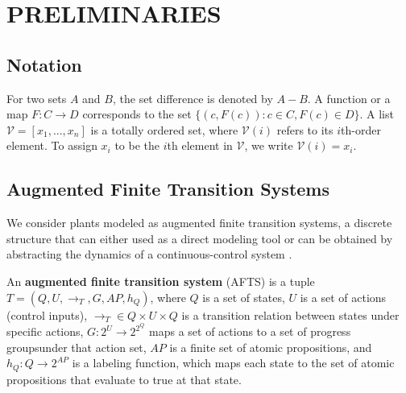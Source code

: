 \section{PRELIMINARIES}
\label{sec:pre}
\subsection{Notation}

For two sets $ A $ and $ B $, the set difference is denoted by $ A-B $. A function or a map $ F: C\rightarrow D $ {\color{purple} corresponds to  the set} $ \{(c,F(c)):c\in C, F(c)\in D \} $. A list $ \mathcal{V}=[x_1,...,x_n] $ is a totally ordered set, where $ \mathcal{V}(i) $ refers to its $ i $th-order element. To assign $ x_i $ to be the $ i $th element in	 $ \mathcal{V} $, we write $ \mathcal{V}(i) = x_i $. %

\subsection{Augmented Finite Transition Systems}

We consider plants modeled as augmented finite transition systems, a discrete structure that can either used as a direct modeling tool or can be obtained by abstracting the dynamics of a continuous-control system \cite{Nilsson2017}.

\begin{definition}
	An \textbf{augmented finite transition system} (AFTS) is a tuple $ T = (Q,U,\rightarrow_T, G,AP,h_Q) $, where $ Q $ is a set of states, $U$ is a set of actions (control inputs), $ \rightarrow_T\in Q\times U \times Q $ is a transition relation between states under specific actions, $ G: 2^U\rightarrow 2^{2^Q} $ maps a set of actions to a set of progress groups\footnotemark under that action set, $ AP $ is a finite set of atomic propositions, and $ h_Q: Q\rightarrow 2^{AP} $ is a labeling function, which maps each state to the set of atomic propositions that evaluate to true at that state. 
\end{definition}

